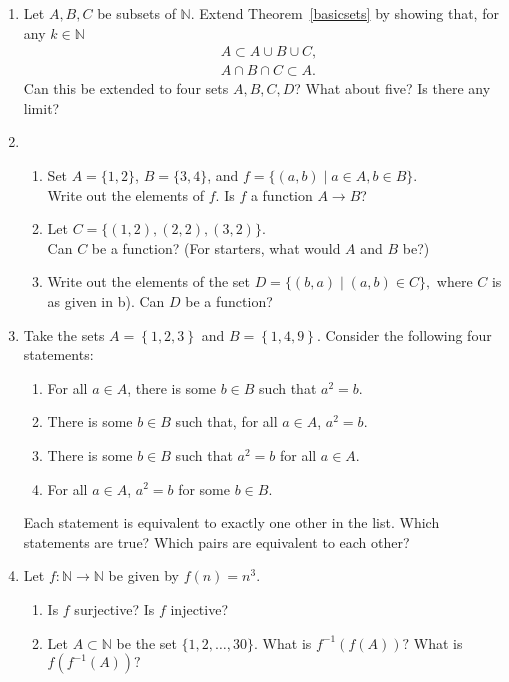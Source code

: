 \documentclass[11pt]{article}
\newcommand{\bbN}{\mathbb{N}}
\theoremstyle{definition}
\numberwithin{equation}{subsection}
\begin{document}
\begin{enumerate}
\item 


Let $A, B, C$ be subsets of $\bbN$.  Extend Theorem~\ref{basicsets} by showing that, for any $k \in \bbN$
\[\begin{split}
	&A\subset A \cup B \cup C,\\
	&A \cap B \cap C \subset A.
\end{split}
\]
Can this be extended to four sets $A,B,C,D$?  What about five?  Is there any limit?


\item  
\begin{enumerate}
\item Set
$A = \{1,2\}$, 
$B = \{3,4\}$, and
$f = \{(a,b) \mid a\in A, b \in B \}$.  \\
Write out the elements of $f$.  Is $f$ a function $A \to B$?

\item Let $C=\{(1,2),(2,2),(3,2)\}$. \\
Can $C$ be a function?  (For starters, what would $A$ and $B$ be?)

\item Write out the elements of the set $D= \{(b,a) \mid (a,b) \in C\}, $ where $C$ is as given in b). Can $D$ be a function?  
\end{enumerate}


\item Take the sets $A=\left\{1,2,3\right\}$ and $B=\left\{1,4,9\right\}$. Consider the following four statements:
\begin{enumerate}
\item For all $a\in A$, there is some $b\in B$ such that $a^2=b$.
\item There is some $b\in B$ such that, for all $a\in A$, $a^2=b$.
\item There is some $b\in B$ such that $a^2=b$ for all $a\in A$.
\item For all $a\in A$, $a^2=b$ for some $b\in B$.
\end{enumerate}
Each statement is equivalent to exactly one other in the list. Which statements are true? Which pairs are equivalent to each other?


\item
Let $f:\bbN\rightarrow\bbN$ be given by $f(n)=n^3.$
\begin{enumerate}
\item Is $f$ surjective?  Is $f$ injective?
\item Let $A\subset\bbN$ be the set $\{1,2,\ldots,30\}.$  What is $f^{-1}(f(A))?$  What is
$f(f^{-1}(A))?$
\end{enumerate}



\end{enumerate}
\end{document}
